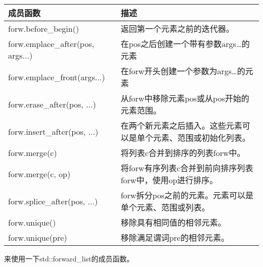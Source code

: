\begin{longtable}[c]{|l|l|}
\hline
\textbf{成员函数}         & \textbf{描述}                                                                           \\ \hline
\endfirsthead
%
\endhead
%
forw.before\_begin()              & 返回第一个元素之前的迭代器。                                                  \\ \hline
forw.emplace\_after(pos, args...) & 在pos之后创建一个带有参数args…的元素                                        \\ \hline
forw.emplace\_front(args...)      & 在forw开头创建一个参数为args…的元素                         \\ \hline
forw.erase\_after(pos, ...)       & 从forw中移除元素pos或从pos开始的元素范围。                   \\ \hline
forw.insert\_after(pos, ...) & 在两个新元素之后插入。这些元素可以是单个元素、范围或初始化列表。                        \\ \hline
forw.merge(c)                     & 将列表c合并到排序的列表forw中。 \\ \hline
forw.merge(c, op)            & 将forw有序列表c合并到前向排序列表forw中，使用op进行排序。 \\ \hline
forw.splice\_after(pos, ...) & forw拆分pos之前的元素。元素可以是单个元素、范围或列表。                               \\ \hline
forw.unique()                     & 移除具有相同值的相邻元素。                                                 \\ \hline
forw.unique(pre)                  & 移除满足谓词pre的相邻元素。                                       \\ \hline
\end{longtable}

来使用一下std::forward\_list的成员函数。


